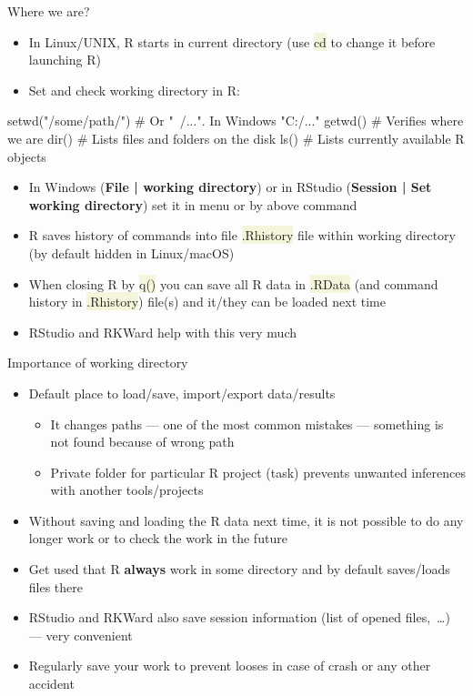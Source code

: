 \documentclass[compress, ucs, xelatex, 11pt, xcolor=svgnames, aspectratio=169,
	hyperref={
		bookmarks=true,
		unicode=true,
		colorlinks=true,
		pdftitle={Molecular data in R},
		plainpages=false,
		pdfauthor={Vojtech Zeisek},
		pdfsubject={Course about phylogeny and evolution in R},
		pdfcreator={XeLaTeX},
		pdfkeywords={R, evolution, phylogeny, molecular data},
		linkcolor=Crimson, %
		anchorcolor=Magenta, %
		citecolor=Magenta, %
		filecolor=Magenta, %
		menucolor=Magenta, %
		urlcolor=DodgerBlue, %
		pdftex},
	url={hyphens, lowtilde} %
	]{beamer}
\renewcommand{\texttt}[1]{\colorbox{Beige}{{\ttfamily #1}}}
\begin{document}
\begin{frame}[fragile]{Where we are?}
	\begin{itemize}
		\item In Linux/UNIX, R starts in current directory (use \texttt{cd} to change it before launching R)
		\item \alert{Set and check working directory} in R:
	\end{itemize}
	\begin{spluscode}
    setwd("/some/path/") # Or "~/...". In Windows "C:/..."
    getwd() # Verifies where we are
    dir() # Lists files and folders on the disk
    ls() # Lists currently available R objects
	\end{spluscode}
	\begin{itemize}
		\item In Windows (\textbf{File | working directory}) or in RStudio (\textbf{Session | Set working directory}) set it in menu or by above command
		\item R saves history of commands into file \texttt{.Rhistory} file within working directory (by default hidden in Linux/macOS)
		\item When closing R by \texttt{q()} you can save all R data in \texttt{.RData} (and command history in \texttt{.Rhistory}) file(s) and it/they can be loaded next time
		\item RStudio and RKWard help with this very much
	\end{itemize}
\end{frame}

\begin{frame}{Importance of working directory}
	\begin{itemize}
		\item Default place to load/save, import/export data/results
		\begin{itemize}
			\item It changes paths --- one of the most common mistakes --- something is not found because of wrong path
			\item Private folder for particular R project (task) prevents unwanted inferences with another tools/projects
		\end{itemize}
		\item Without saving and loading the R data next time, it is not possible to do any longer work or to check the work in the future
		\item \alert{Get used that R \textbf{always} work in some directory and by default saves/loads files there}
		\item RStudio and RKWard also save session information (list of opened files,~\ldots) --- very convenient
		\item Regularly save your work to prevent looses in case of crash or any other accident
	\end{itemize}
\end{frame}
\end{document}
